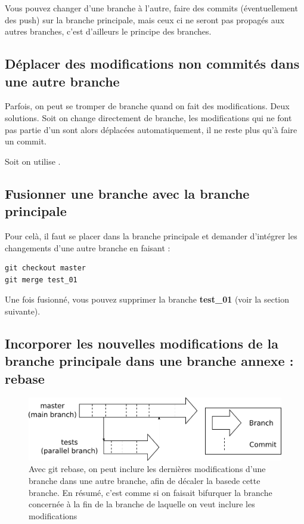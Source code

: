 \documentclass[a4paper,twoside]{article}
\begin{document}
\begin{attention}
Vous pouvez changer d'une branche à l'autre, faire des commits (éventuellement des push) sur la branche principale, mais ceux ci ne seront pas propagés aux autres branches, c'est d'ailleurs le principe des branches. 
\end{attention}

\subsection{Déplacer des modifications non commités dans une autre branche}
Parfois, on peut se tromper de branche quand on fait des modifications. Deux solutions. Soit on change directement de branche, les modifications qui ne font pas partie d'un  sont alors déplacées automatiquement, il ne reste plus qu'à faire un commit. 

Soit on utilise  .

\subsection{Fusionner une branche avec la branche principale}
Pour celà, il faut se placer dans la branche principale et demander d'intégrer les changements d'une autre branche en faisant : 
\begin{verbatim}
git checkout master
git merge test_01
\end{verbatim}

Une fois fusionné, vous pouvez supprimer la branche \textbf{test\_01} (voir la section suivante).

\subsection{Incorporer les nouvelles modifications de la branche principale dans une branche annexe : rebase}
\begin{figure}[htb]
\centering
\includegraphics[width=0.75\linewidth]{figure/branchs.pdf}
\caption{Avec git rebase, on peut inclure les dernières modifications d'une branche dans une autre branche, afin de décaler la \og base\fg de cette branche. En résumé, c'est comme si on faisait bifurquer la branche concernée à la fin de la branche de laquelle on veut inclure les modifications}
\end{figure}
\end{document}
